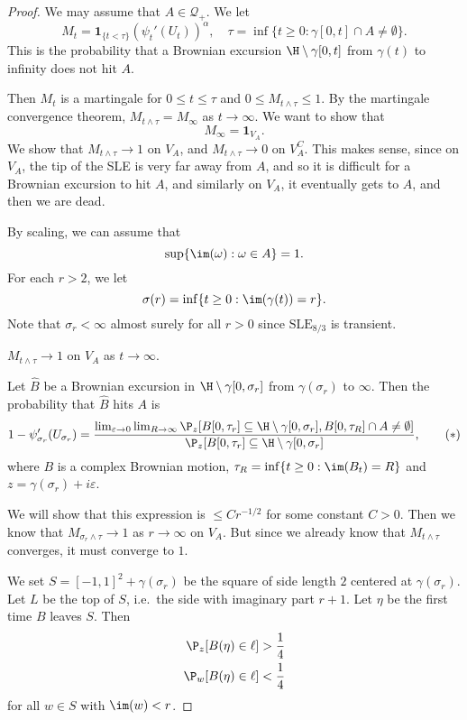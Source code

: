 \documentclass[a4paper]{article}
\newcommand\SLE{\mathrm{SLE}}
\begin{document}
\begin{proof}
  We may assume that $A \in \mathcal{Q}_+$. We let
  \[
    M_t = \mathbf{1}_{\{t < \tau\}}(\psi_t'(U_t))^\alpha,\quad \tau = \inf \{t \geq 0: \gamma[0, t] \cap A \not= \emptyset\}.
  \]
  This is the probability that a Brownian excursion $\H \setminus \gamma[0, t]$ from $\gamma(t)$ to infinity does not hit $A$.

  Then $M_t$ is a martingale for $0 \leq t \leq \tau$ and $0 \leq M_{t \wedge \tau} \leq 1$. By the martingale convergence theorem, $M_{t \wedge \tau} = M_\infty$ as $t \to \infty$. We want to show that
  \[
    M_\infty = \mathbf{1}_{V_A}.
  \]
  We show that $M_{t \wedge \tau} \to 1$ on $V_A$, and $M_{t \wedge \tau} \to 0$ on $V_A^C$. This makes sense, since on $V_A$, the tip of the SLE is very far away from $A$, and so it is difficult for a Brownian excursion to hit $A$, and similarly on $V_A$, it eventually gets to $A$, and then we are dead.

  By scaling, we can assume that
  \[
    \sup \{\im(\omega): \omega \in A\} = 1.
  \]
  For each $r > 2$, we let
  \[
    \sigma(r) = \inf \{t \geq 0 : \im(\gamma(t)) = r\}.
  \]
  Note that $\sigma_r < \infty$ almost surely for all $r > 0$ since $\SLE_{8/3}$ is transient.
  \begin{claim}
    $M_{t \wedge \tau} \to 1$ on $V_A$ as $t \to \infty$.
  \end{claim}
  Let $\hat{B}$ be a Brownian excursion in $\H \setminus \gamma[0, \sigma_r]$ from $\gamma(\sigma_r)$ to $\infty$. Then the probability that $\hat{B}$ hits $A$ is
  \[
    1 - \psi_{\sigma_r}'(U_{\sigma_r}) = \frac{\lim_{\varepsilon \to 0} \lim_{R \to \infty} \P_z [B[0, \tau_r] \subseteq \H \setminus \gamma[0, \sigma_r], B[0, \tau_R] \cap A \not= \emptyset]}{\P_z[B[0, \tau_r] \subseteq \H \setminus \gamma[0, \sigma_r]},\tag{$*$}
  \]
  where $B$ is a complex Brownian motion, $\tau_R = \inf \{t \geq 0: \im (B_t) = R\}$ and $z = \gamma(\sigma_r) + i \varepsilon$.

  We will show that this expression is $\leq C r^{-1/2}$ for some constant $C > 0$. Then we know that $M_{\sigma_r \wedge \tau} \to 1$ as $r \to \infty$ on $V_A$. But since we already know that $M_{t \wedge \tau}$ converges, it must converge to $1$.

  We set $S = [-1, 1]^2 + \gamma(\sigma_r)$ be the square of side length $2$ centered at $\gamma(\sigma_r)$. Let $L$ be the top of $S$, i.e.\ the side with imaginary part $r + 1$. Let $\eta$ be the first time $B$ leaves $S$. Then
  \begin{align*}
    \P_z[B(\eta) \in \ell] &> \frac{1}{4}\\
    \P_w[B(\eta) \in \ell] &< \frac{1}{4}
  \end{align*}
  for all $w \in S$ with $\im(w) < r$.


\end{proof}
\end{document}
